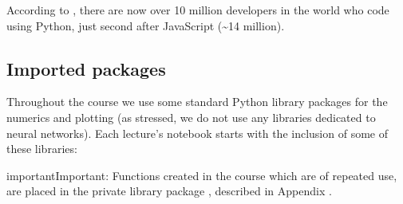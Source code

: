 \documentclass[letterpaper,10pt,english]{jupyterBook}
\begin{document}
\sphinxAtStartPar
According to , there are now over 10 million developers in the world who code using Python, just second after JavaScript (\textasciitilde{}14 million).


\subsection{Imported packages}
\label{\detokenize{docs/intro:imported-packages}}
\sphinxAtStartPar
Throughout the course we use some standard Python library packages for the numerics and plotting (as stressed, we do not use any libraries dedicated to neural networks). Each lecture’s notebook starts with the inclusion of some of these libraries:

\begin{sphinxVerbatim}[commandchars=\\\{\}]
                 
            
    
           
         

      
      
\end{sphinxVerbatim}

\begin{sphinxadmonition}{important}{Important:}
\sphinxAtStartPar
Functions created in the course which are of repeated use, are placed in the private library package , described in Appendix {\hyperref[\detokenize{docs/appendix:app-lab}]{}}.
\end{sphinxadmonition}
\end{document}
